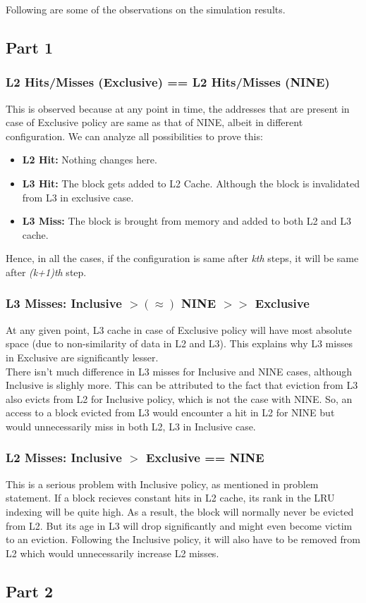     Following are some of the observations on the simulation results.
\subsection{Part 1}
\subsubsection{L2 Hits/Misses (Exclusive) == L2 Hits/Misses (NINE)}
This is observed because at any point in time, the addresses that are present in case of Exclusive 
policy are same as that of NINE, albeit in different configuration. We can analyze all 
possibilities to prove this:
\begin{itemize}
	\item \textbf{L2 Hit:} Nothing changes here.
	\item \textbf{L3 Hit:} The block gets added to L2 Cache. Although the block is invalidated from L3 in exclusive case.
	\item \textbf{L3 Miss:} The block is brought from memory and added to both L2 and L3 cache.
\end{itemize}
Hence, in all the cases, if the configuration is same after \textit{kth} steps, it will be same 
after \textit{(k+1)th} step.

\subsubsection{L3 Misses: Inclusive $ >(\approx)$ NINE $>>$ Exclusive}
At any given point, L3 cache in case of Exclusive policy will have most absolute space (due to 
non-similarity of data in L2 and L3). This explains why L3 misses in Exclusive are significantly 
lesser.\\
There isn't much difference in L3 misses for Inclusive and NINE cases, although Inclusive is 
slighly more. This can be attributed to the fact that eviction from L3 also evicts from L2 for 
Inclusive policy, which is not the case with NINE. So, an access to a block evicted from L3 would
encounter a hit in L2 for NINE but would unnecessarily miss in both L2, L3 in Inclusive case.

\subsubsection{L2 Misses: Inclusive $>$ Exclusive == NINE}
This is a serious problem with Inclusive policy, as mentioned in problem statement. If a block 
recieves constant hits in L2 cache, its rank in the LRU indexing will be quite high. As a result,
the block will normally never be evicted from L2. But its age in L3 will drop significantly and
 might even become victim to an eviction. Following the Inclusive policy, it will also have to be
removed from L2 which would unnecessarily increase L2 misses.

\subsection{Part 2}